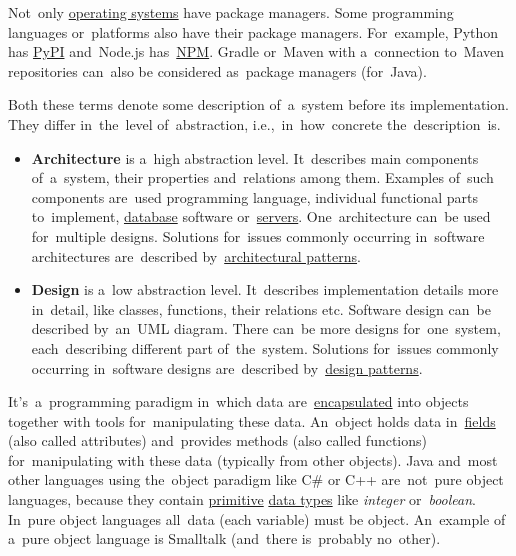 Not~only \hyperref[os]{operating systems} have package managers. Some programming languages or~platforms also have their package managers. For~example, Python has \href{https://pypi.org/}{PyPI} and~Node.js has~\hyperref[npm]{NPM}. Gradle or~Maven with a~connection to~Maven repositories can~also be considered as~package managers (for~Java).
\newpage

\label{architecturedesign}
Both these terms denote some description of~a~system before its implementation. They differ in~the~level of~abstraction, i.e.,~in~how~concrete the~description~is.
\begin{itemize}
    \item \textbf{Architecture} is a~high abstraction level. It~describes main components of~a~system, their properties and~relations among them. Examples of~such components are~used programming language, individual functional parts to~implement, \hyperref[databases]{database} software or~\hyperref[server]{servers}. One~architecture can~be used for~multiple designs. Solutions for~issues commonly occurring in~software architectures are~described by~\hyperref[architecturalpatterns]{architectural patterns}.
    \item \textbf{Design} is a~low abstraction level. It~describes implementation details more in~detail, like classes, functions, their relations etc. Software design can~be described by~an~UML diagram. There can~be more designs for~one~system, each~describing different part of~the~system. Solutions for~issues commonly occurring in~software designs are~described by~\hyperref[designpatterns]{design patterns}.
\end{itemize}

\label{objectorientedprogramming}
It's~a~programming paradigm in~which data are~\hyperref[encapsulation]{encapsulated} into objects together with tools for~manipulating these data. An~object holds data in~\hyperref[variablefieldproperty]{fields} (also called attributes) and~provides methods (also called functions) for~manipulating with these data (typically from other objects). Java and~most other languages using the~object paradigm like C\# or C++ are~not~pure object languages, because they contain \hyperref[javadatatypes]{primitive} \hyperref[datatypes]{data types} like \textit{integer} or~\textit{boolean}. In~pure object languages all~data (each variable) must be object. An~example of a~pure object language is Smalltalk (and~there is~probably no~other).

